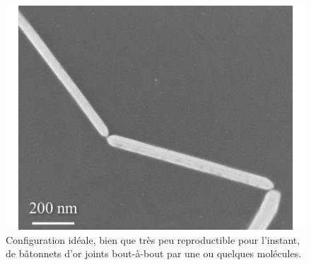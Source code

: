 \begin{figure}[h!]
\parbox{7cm}{
\includegraphics[scale=0.45]{Conclusion/BottomUp/BottomUp.pdf} 
}
\parbox{6.5cm}{\caption{Configuration idéale, bien que très peu reproductible pour l'instant,
de bâtonnets d'or joints bout-à-bout par une ou quelques molécules.}
\label{BottomUpConclu}
}
\end{figure}

